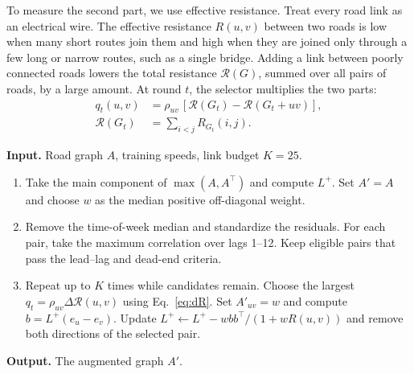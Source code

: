 \documentclass[journal]{IEEEtran}
\begin{document}
To measure the second part, we use effective resistance. Treat every road link as an electrical wire. The effective resistance $R(u,v)$ between two roads is low when many short routes join them and high when they are joined only through a few long or narrow routes, such as a single bridge. Adding a link between poorly connected roads lowers the total resistance $\mathcal{R}(G)$, summed over all pairs of roads, by a large amount. At round $t$, the selector multiplies the two parts:
\[
\begin{aligned}
 q_t(u,v) &= \rho_{uv}\,[\mathcal{R}(G_t)-\mathcal{R}(G_t+uv)],\\
 \mathcal{R}(G_t) &= \sum_{i<j}R_{G_t}(i,j).
\end{aligned}
\]
\begin{algorithm}[!t]
\caption{Lead--lag selector selector (Stage 1)}
\label{alg:greedy}
\small
\textbf{Input.} Road graph $A$, training speeds, link budget $K=25$.\par
\begin{enumerate}\setlength{\itemsep}{1pt}
\item Take the main component of $\max(A,A^\top)$ and compute $L^+$. Set $A'=A$ and choose $w$ as the median positive off-diagonal weight.
\item Remove the time-of-week median and standardize the residuals. For each pair, take the maximum correlation over lags 1--12. Keep eligible pairs that pass the lead--lag and dead-end criteria.
\item Repeat up to $K$ times while candidates remain. Choose the largest $q_t=\rho_{uv}\Delta\mathcal R(u,v)$ using Eq.~\eqref{eq:dR}. Set $A'_{uv}=w$ and compute $b=L^+(e_u-e_v)$. Update $L^+\leftarrow L^+ - wbb^\top/(1+wR(u,v))$ and remove both directions of the selected pair.
\end{enumerate}
\textbf{Output.} The augmented graph $A'$.
\end{algorithm}
\end{document}
